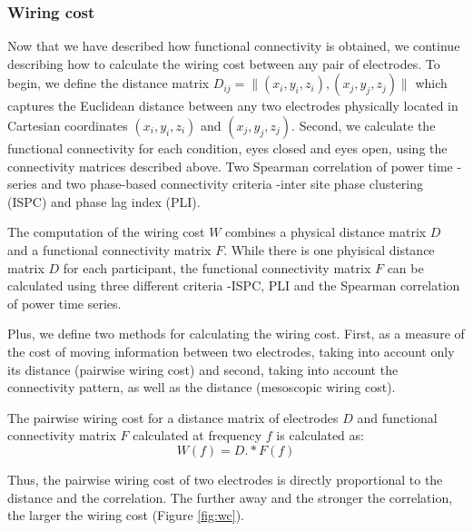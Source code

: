 \documentclass[11pt, onecolumn]{article}
\begin{document}
\subsubsection{Wiring cost}
Now that we have described how functional connectivity is obtained, we continue describing how to calculate the wiring cost between any pair of electrodes. 
To begin, we define the distance matrix   
$D_{ij} = \Big\|(x_i,y_i,z_i),(x_j,y_j,z_j) \Big\|$ 
which captures the Euclidean distance between any two electrodes physically located in Cartesian coordinates $(x_i,y_i,z_i)$ and $(x_j,y_j,z_j)$.
Second, we calculate the functional connectivity for each condition, eyes closed and eyes open, using the connectivity matrices described above. Two Spearman correlation of power time -series and two phase-based connectivity criteria -inter site phase clustering (ISPC) and phase lag index (PLI). %

The computation of the wiring cost $W$ combines a physical distance matrix $D$ and a functional connectivity matrix $F$. While there is one  phyisical distance matrix $D$ for each participant, the functional connectivity matrix $F$ can be calculated using three different criteria -ISPC, PLI and the Spearman correlation of power time series.

Plus, we define two methods for calculating the  wiring cost. First, as a measure of the cost of moving information between two electrodes, taking into account only its distance (pairwise wiring cost) and second, taking into account the connectivity pattern, as well as the distance (mesoscopic wiring cost).

The pairwise wiring cost for a distance matrix of electrodes $D$ and functional connectivity matrix $F$ calculated at frequency $f$ is calculated as:
\begin{equation}
W(f) = D.*F(f)
\label{eq:pairwc}
\end{equation} 

Thus, the pairwise wiring cost of two electrodes is directly proportional to the distance and the correlation. The further away and the stronger the correlation, the larger the wiring cost (Figure \ref{fig:wc}). 
\end{document}
